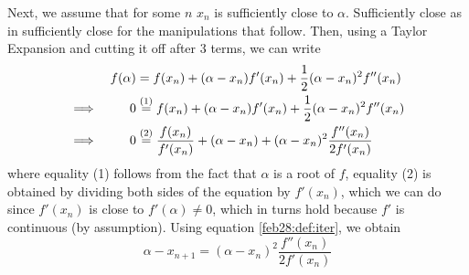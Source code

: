 Next, we assume that for some $n$ $x_n$ is sufficiently close to $\alpha$. Sufficiently close as in sufficiently close for the manipulations that follow. Then, using a Taylor Expansion and cutting it off after 3 terms, we can write
\begin{alignat*}{3}
  &&f(\alpha)
  &=
    f(x_n) + (\alpha - x_n)f'(x_n) + \frac 12 (\alpha - x_n)^2f''(x_n) \\
  \implies&&
  0
  &\overset{(1)}{=}
  f(x_n) + (\alpha - x_n)f'(x_n) + \frac 12 (\alpha - x_n)^2f''(x_n) \\
  \implies&&
  0
  &\overset{(2)}{=}
  \frac{f(x_n)}{f'(x_n)} + (\alpha - x_n) + (\alpha - x_n)^2\frac{f''(x_n)}{2f'(x_n)} \\
\end{alignat*}
where equality (1) follows from the fact that $\alpha$ is a root of $f$, equality (2) is obtained by dividing both sides of the equation by $f'(x_n)$, which we can do since $f'(x_n)$ is close to $f'(\alpha) \neq 0$, which in turns hold because $f'$ is continuous (by assumption). Using equation \ref{feb28:def:iter}, we obtain
\[
  \alpha - x_{n+1} = (\alpha - x_n)^2\frac{f''(x_n)}{2f'(x_n)}
\]
